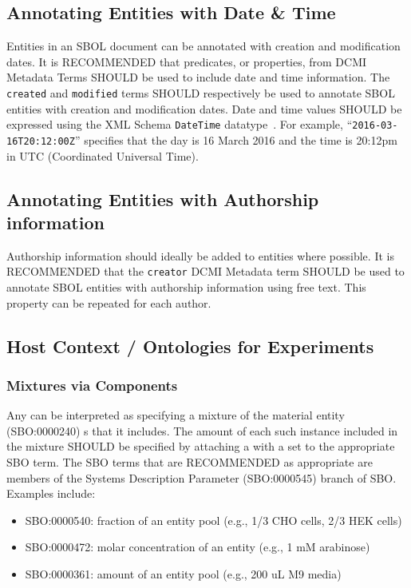 \subsection{Annotating Entities with Date \& Time}\label{sec:DateTime}

Entities in an SBOL document can be annotated with creation and modification dates. It is RECOMMENDED that predicates, or properties, from DCMI Metadata Terms SHOULD be used to include date and time information. The \texttt{created} and \texttt{modified} terms SHOULD respectively be used to annotate SBOL entities with creation and modification dates. Date and time values SHOULD be expressed using the XML Schema \texttt{DateTime} datatype~\citep{Biron2004}. For example, ``\texttt{2016-03-16T20:12:00Z}'' specifies that the day is 16 March 2016 and the time is 20:12pm in UTC (Coordinated Universal Time).

\subsection{Annotating Entities with Authorship information}\label{sec:Authorship}

Authorship information should ideally be added to  entities where possible. It is RECOMMENDED that the \texttt{creator} DCMI Metadata term SHOULD be used to annotate SBOL entities with authorship information using free text. This property can be repeated for each author.

\subsection{Host Context / Ontologies for Experiments}

\subsubsection{Mixtures via Components}

Any  can be interpreted as specifying a mixture of the material entity (SBO:0000240) s that it includes.  The amount of each such instance included in the mixture SHOULD be specified by attaching a  with a  set to the appropriate SBO term. The SBO terms that are RECOMMENDED as appropriate are members of the Systems Description Parameter (SBO:0000545) branch of SBO. Examples include:
\begin{itemize}
\item SBO:0000540: fraction of an entity pool (e.g., 1/3 CHO cells, 2/3 HEK cells)
\item SBO:0000472: molar concentration of an entity (e.g., 1 mM arabinose)
\item SBO:0000361: amount of an entity pool (e.g., 200 uL M9 media)
\end{itemize}

